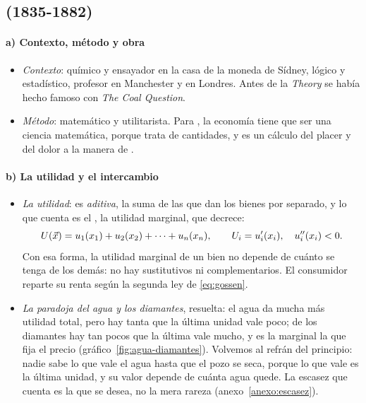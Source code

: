\documentclass[11pt]{article}
\begin{document}
\subsection{ (1835-1882)}\label{sec:jevons}

\paragraph{a) Contexto, método y obra}

\begin{itemize}
\item \emph{Contexto}: químico y ensayador en la casa de la moneda de Sídney, lógico y estadístico, profesor en Manchester y en Londres. Antes de la \emph{Theory} se había hecho famoso con \emph{The Coal Question}\nocite{Jevons1865Coal}.
\item \emph{Método}: matemático y utilitarista. Para , la economía tiene que ser una ciencia matemática, porque trata de cantidades, y es un cálculo del placer y del dolor a la manera de \nocite{Jevons1871Theory}.
\end{itemize}

\paragraph{b) La utilidad y el intercambio}

\begin{itemize}
\item \emph{La utilidad}: es \emph{aditiva}, la suma de las que dan los bienes por separado, y lo que cuenta es el , la utilidad marginal, que decrece:
  \begin{equation}
  U(\vec{x})=u_1(x_1)+u_2(x_2)+\dots+u_n(x_n),\qquad U_i=u_i'(x_i),\quad u_i''(x_i)<0. \label{eq:jevons}
  \end{equation}
  Con esa forma, la utilidad marginal de un bien no depende de cuánto se tenga de los demás: no hay sustitutivos ni complementarios. El consumidor reparte su renta según la segunda ley de  \eqref{eq:gossen}.
\item \emph{La paradoja del agua y los diamantes}, resuelta: el agua da mucha más utilidad total, pero hay tanta que la última unidad vale poco; de los diamantes hay tan pocos que la última vale mucho, y es la marginal la que fija el precio (gráfico~\ref{fig:agua-diamantes}). Volvemos al refrán del principio: nadie sabe lo que vale el agua hasta que el pozo se seca, porque lo que vale es la última unidad, y su valor depende de cuánta agua quede. La escasez que cuenta es la que se desea, no la mera rareza (anexo~\ref{anexo:escasez}).
\end{itemize}
\end{document}
